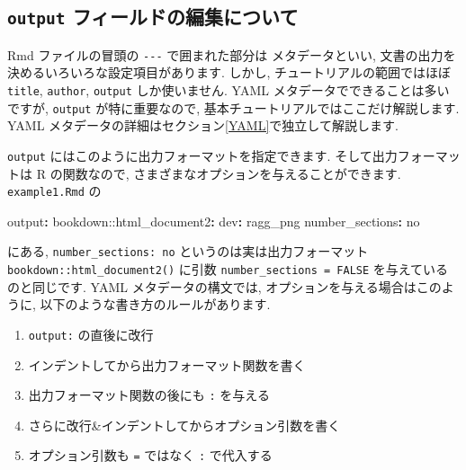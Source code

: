 \documentclass[
]{ltjsarticle}
\newenvironment{Shaded}{\begin{snugshade}}{\end{snugshade}}
\newcommand{\AttributeTok}[1]{\textcolor[rgb]{0.77,0.63,0.00}{#1}}
\newcommand{\CharTok}[1]{\textcolor[rgb]{0.31,0.60,0.02}{#1}}
\newcommand{\FunctionTok}[1]{\textcolor[rgb]{0.00,0.00,0.00}{#1}}
\newcommand{\KeywordTok}[1]{\textcolor[rgb]{0.13,0.29,0.53}{\textbf{#1}}}
\providecommand{\tightlist}{%
  \setlength{\itemsep}{0pt}\setlength{\parskip}{0pt}}
\begin{document}
\hypertarget{output-ux30d5ux30a3ux30fcux30ebux30c9ux306eux7de8ux96c6ux306bux3064ux3044ux3066}{%
\subsection{\texorpdfstring{\texttt{output} フィールドの編集について}{output フィールドの編集について}}\label{output-ux30d5ux30a3ux30fcux30ebux30c9ux306eux7de8ux96c6ux306bux3064ux3044ux3066}}

Rmd ファイルの冒頭の \texttt{-\/-\/-} で囲まれた部分は  メタデータといい, 文書の出力を決めるいろいろな設定項目があります. しかし, チュートリアルの範囲ではほぼ \texttt{title}, \texttt{author}, \texttt{output} しか使いません. YAML メタデータでできることは多いですが, \texttt{output} が特に重要なので, 基本チュートリアルではここだけ解説します. YAML メタデータの詳細はセクション\ref{YAML}で独立して解説します.

\texttt{output} にはこのように出力フォーマットを指定できます. そして出力フォーマットは R の関数なので, さまざまなオプションを与えることができます. \texttt{example1.Rmd} の

\begin{Shaded}
\begin{Highlighting}[]
\FunctionTok{output}\KeywordTok{:}
\AttributeTok{  bookdown:}\FunctionTok{:html\_document2}\KeywordTok{:}
\AttributeTok{    }\FunctionTok{dev}\KeywordTok{:}\AttributeTok{ ragg\_png}
\AttributeTok{    }\FunctionTok{number\_sections}\KeywordTok{:}\AttributeTok{ }\CharTok{no}
\end{Highlighting}
\end{Shaded}

にある, \texttt{number\_sections:\ no} というのは実は出力フォーマット \texttt{bookdown::html\_document2()} に引数 \texttt{number\_sections\ =\ FALSE} を与えているのと同じです. YAML メタデータの構文では, オプションを与える場合はこのように, 以下のような書き方のルールがあります.

\begin{enumerate}
\def\labelenumi{\arabic{enumi}.}
\tightlist
\item
  \texttt{output:} の直後に改行
\item
  インデントしてから出力フォーマット関数を書く
\item
  出力フォーマット関数の後にも \texttt{:} を与える
\item
  さらに改行\&インデントしてからオプション引数を書く
\item
  オプション引数も \texttt{=} ではなく \texttt{:} で代入する
\end{enumerate}
\end{document}
